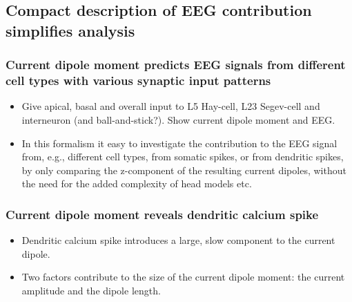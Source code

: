 \documentclass[preprint,10pt,authoryear]{elsarticle}
\newcommand{\sntxt}[1]{{\color{NavyBlue}#1}}
\begin{document}
\subsection{Compact description of EEG contribution simplifies analysis}\label{subsec:compact}

\subsubsection{Current dipole moment predicts EEG signals from different cell types with various synaptic input patterns}
\sntxt{
\begin{itemize}
	\item Give apical, basal and overall input to L5 Hay-cell, L23 Segev-cell and interneuron (and ball-and-stick?). Show current dipole moment and EEG.
	\item In this formalism it easy to investigate the contribution to the EEG signal from, e.g., different cell types, from somatic spikes, or from dendritic spikes, by only comparing the z-component of the resulting current dipoles, without the need for the added complexity of head models etc. 
	
\end{itemize}
}
\subsubsection{Current dipole moment reveals dendritic calcium spike}
\sntxt{
\begin{itemize}
	\item Dendritic calcium spike introduces a large, slow component to the current dipole.
	\item Two factors contribute to the size of the current dipole moment: the current amplitude and the dipole length.
\end{itemize}
	
}
\end{document}
